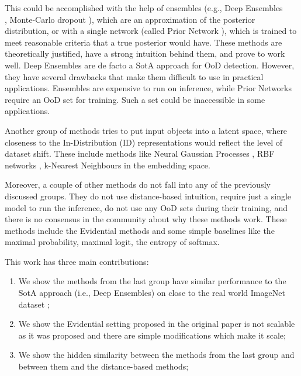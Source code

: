 \documentclass{article}
\begin{document}
This could be accomplished with the help of ensembles (e.g., Deep Ensembles \\ \cite{deep_ensembles}, Monte-Carlo dropout \cite{monte_carlo_dropout}), which are an approximation of the posterior distribution, or with a single network (called Prior Network \cite{prior_net}), which is trained to meet reasonable criteria that a true posterior would have.
These methods are theoretically justified, have a strong intuition behind them, and prove to work well.
Deep Ensembles are de facto a SotA approach for OoD detection.
However, they have several drawbacks that make them difficult to use in practical applications.
Ensembles are expensive to run on inference, while Prior Networks require an OoD set for training. Such a set could be inaccessible in some applications.

Another group of methods tries to put input objects into a latent space, where closeness to the In-Distribution (ID) representations would reflect the level of dataset shift. These include methods like Neural Gaussian Processes \cite{gp}, RBF networks \cite{duq, duq_improved}, k-Nearest Neighbours \cite{knn} in the embedding space.

Moreover, a couple of other methods do not fall into any of the previously discussed groups.
They do not use distance-based intuition, require just a single model to run the inference, do not use any OoD sets during their training, and there is no consensus in the community about why these methods work.
These methods include the Evidential methods and some simple baselines like the maximal probability, maximal logit, the entropy of softmax.

This work has three main contributions:
\begin{enumerate}
\item We show the methods from the last group have similar performance to the SotA approach (i.e., Deep Ensembles) on close to the real world ImageNet dataset \cite{imagenet};
\item We show the Evidential setting proposed in the original paper \cite{evidential_classification} is not scalable as it was proposed and there are simple modifications which make it scale;
\item We show the hidden similarity between the methods from the last group and between them and the distance-based methods;
\end{enumerate}
\end{document}
